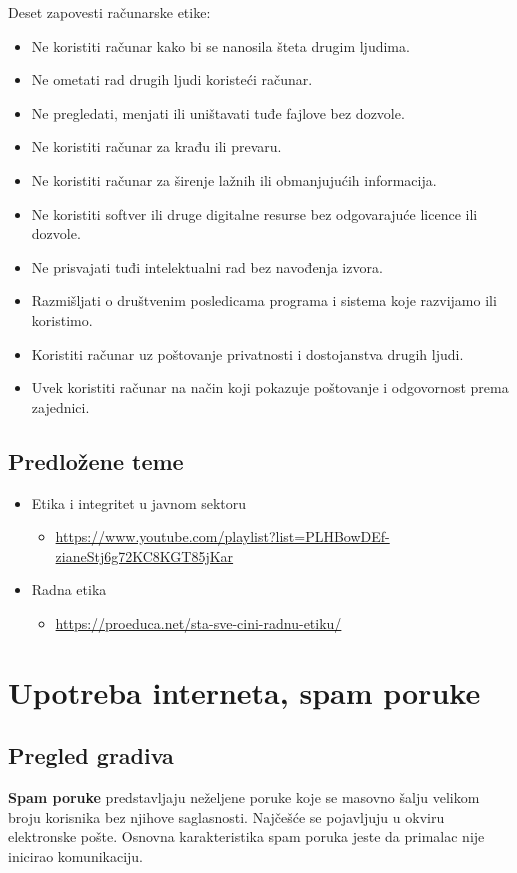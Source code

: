 \documentclass[a4paper, 12pt]{article}
\begin{document}
\newpage
Deset zapovesti računarske etike:
\begin{itemize}
    \item Ne koristiti računar kako bi se nanosila šteta drugim ljudima.
    \item Ne ometati rad drugih ljudi koristeći računar.
    \item Ne pregledati, menjati ili uništavati tuđe fajlove bez dozvole.
    \item Ne koristiti računar za krađu ili prevaru.
    \item Ne koristiti računar za širenje lažnih ili obmanjujućih informacija.
    \item Ne koristiti softver ili druge digitalne resurse bez odgovarajuće licence
    ili dozvole.
    \item Ne prisvajati tuđi intelektualni rad bez navođenja izvora.
    \item Razmišljati o društvenim posledicama programa i sistema koje razvijamo ili
    koristimo.
    \item Koristiti računar uz poštovanje privatnosti i dostojanstva drugih ljudi.
    \item Uvek koristiti računar na način koji pokazuje poštovanje i odgovornost
    prema zajednici.
\end{itemize}

\subsection{Predložene teme}
\begin{itemize}
    \item Etika i integritet u javnom sektoru
    \begin{itemize}
        \item \url{https://www.youtube.com/playlist?list=PLHBowDEf-zianeStj6g72KC8KGT85jKar}
    \end{itemize}
    \item Radna etika
    \begin{itemize}
        \item \url{https://proeduca.net/sta-sve-cini-radnu-etiku/}
    \end{itemize}
    
\end{itemize}

\section{Upotreba interneta, spam poruke}
\subsection{Pregled gradiva}
\textbf{Spam poruke} predstavljaju neželjene poruke koje se masovno šalju velikom broju
korisnika bez njihove saglasnosti. Najčešće se pojavljuju u okviru elektronske
pošte. Osnovna karakteristika spam poruka jeste da primalac nije inicirao komunikaciju.
\end{document}
